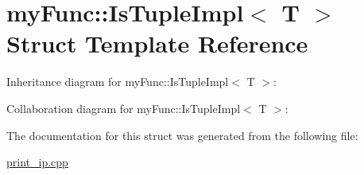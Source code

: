 \hypertarget{structmyFunc_1_1IsTupleImpl}{}\section{my\+Func\+:\+:Is\+Tuple\+Impl$<$ T $>$ Struct Template Reference}
\label{structmyFunc_1_1IsTupleImpl}


Inheritance diagram for my\+Func\+:\+:Is\+Tuple\+Impl$<$ T $>$\+:


Collaboration diagram for my\+Func\+:\+:Is\+Tuple\+Impl$<$ T $>$\+:


The documentation for this struct was generated from the following file\+:\begin{DoxyCompactItemize}
\item 
\hyperlink{print__ip_8cpp}{print\+\_\+ip.\+cpp}\end{DoxyCompactItemize}

